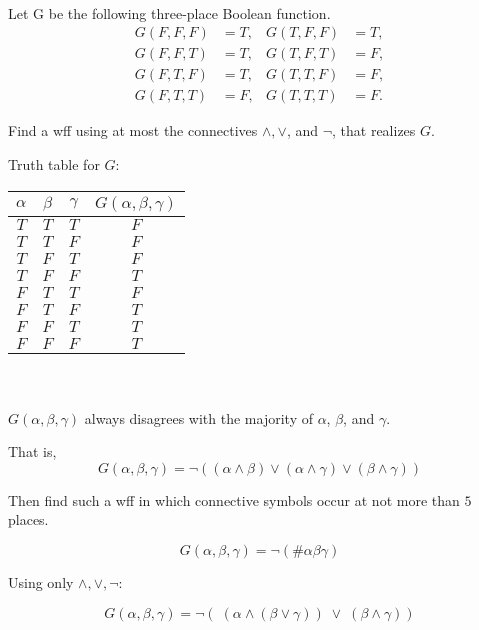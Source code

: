 \documentclass[english, 11pt]{amsart}
\begin{document}
\\
\begin{problem}
  Let G be the following three-place Boolean function.
  \begin{align*}
    G(F, F, F) &= T,&
    G(T, F, F) &= T,\\
    G(F, F, T) &= T,&
    G(T, F, T) &= F,\\
    G(F, T, F) &= T,&
    G(T, T, F) &= F,\\
    G(F, T, T) &= F,&
    G(T, T, T) &= F.
  \end{align*}
  \begin{enumalph}
    \item Find a wff using at most the connectives $\land, \lor$, and $\lnot$,
      that realizes $G$.
      \begin{Answer}
        Truth table for $G$:

        \begin{tabular}{ c c c c }
          $\alpha$ & $\beta$ & $\gamma$ & $G(\alpha, \beta, \gamma)$ \\
          \bottomrule
          $T$ & $T$ & $T$ & $F$ \\
          \midrule
          $T$ & $T$ & $F$ & $F$ \\
          \midrule
          $T$ & $F$ & $T$ & $F$ \\
          \midrule
          $T$ & $F$ & $F$ & $T$ \\
          \midrule
          $F$ & $T$ & $T$ & $F$ \\
          \midrule
          $F$ & $T$ & $F$ & $T$ \\
          \midrule
          $F$ & $F$ & $T$ & $T$ \\
          \midrule
          $F$ & $F$ & $F$ & $T$ \\
          \toprule
        \end{tabular}
        \\ \\
        $G(\alpha, \beta, \gamma)$ always disagrees with the majority
        of $\alpha$, $\beta$, and $\gamma$.
        
        \noindent
        That is, 
        \[ 
          G(\alpha, \beta, \gamma ) = 
            \lnot (
              (\alpha \land \beta ) \lor (\alpha \land \gamma )
              \lor (\beta \land \gamma )
            )
        \]

      \end{Answer}
    \item Then find such a wff in which connective symbols occur at not more than $5$ places.
      \begin{Answer}
        \[ G(\alpha, \beta, \gamma) = \lnot(\# \alpha \beta \gamma)\]

        Using only $\land, \lor, \lnot$:

        \[ G(\alpha, \beta, \gamma) = \lnot(\;(\alpha \land (\beta \lor \gamma))\; \lor \; (\beta \land \gamma))\]
      \end{Answer}
  \end{enumalph}
\end{problem}
\bigskip
\end{document}
